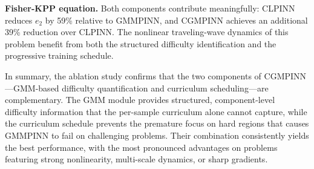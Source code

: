 \documentclass{article}
\theoremstyle{plain}
\theoremstyle{definition}
\theoremstyle{remark}
\begin{document}
\textbf{Fisher-KPP equation.}\;
Both components contribute meaningfully: CLPINN reduces $e_2$ by 59\% relative to GMMPINN, and CGMPINN achieves an additional 39\% reduction over CLPINN. The nonlinear traveling-wave dynamics of this problem benefit from both the structured difficulty identification and the progressive training schedule.

In summary, the ablation study confirms that the two components of CGMPINN---GMM-based difficulty quantification and curriculum scheduling---are complementary. The GMM module provides structured, component-level difficulty information that the per-sample curriculum alone cannot capture, while the curriculum schedule prevents the premature focus on hard regions that causes GMMPINN to fail on challenging problems. Their combination consistently yields the best performance, with the most pronounced advantages on problems featuring strong nonlinearity, multi-scale dynamics, or sharp gradients.
\end{document}

